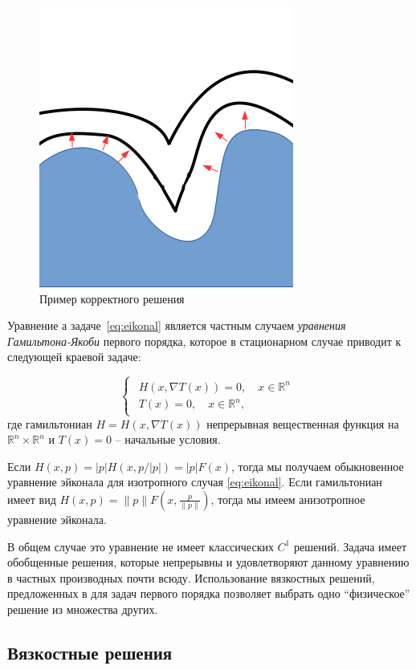 \begin{figure}[h]
  \centering
  \includegraphics[width=0.3\linewidth]{img/corrct-example.png}
  \hfil \caption{Пример корректного решения}
  \label{fig:correct-exmp}

\end{figure}

Уравнение а задаче~\eqref{eq:eikonal} является частным случаем
\textit{уравнения Гамильтона-Якоби} первого порядка, которое в
стационарном случае приводит к следующей краевой задаче:

\begin{equation}
  \label{eq:hje}
  \begin{cases}
    \begin{array}{ll}
      H(x, \nabla T(x)) = 0,\quad x \in \mathbb{R}^n  \\
      T(x) = 0, \quad  x \in \mathbb{R}^n,
    \end{array}
  \end{cases}
\end{equation}
где гамильтониан $H = H(x,\nabla T(x))$ непрерывная вещественная функция на
$\mathbb{R}^n \times \mathbb{R}^n$ и $T(x) = 0$ -- начальные условия.

Если $H(x,p) = |p| H(x,p/|p|) = |p| F(x)$, тогда мы получаем
обыкновенное уравнение эйконала для изотропного случая
\eqref{eq:eikonal}. Если гамильтониан имеет вид
$H(x,p) = \|p\| F(x, \frac{p}{\|p\|})$, тогда мы имеем анизотропное
уравнение эйконала.

В общем случае это уравнение не имеет классических $C^1$
решений. Задача имеет обобщенные решения, которые
непрерывны и удовлетворяют данному уравнению в частных производных
почти всюду. Использование вязкостных  решений, предложенных в
\cite{V1983,V1984} для задач первого порядка позволяет выбрать одно
``физическое'' решение из множества других. 

\subsection{Вязкостные решения}

